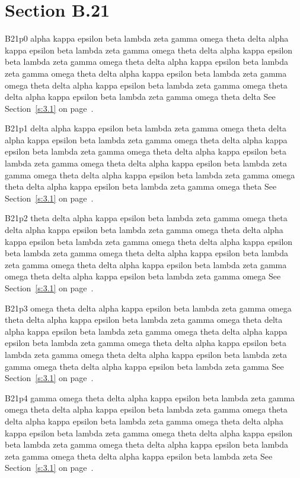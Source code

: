 \section{Section B.21}\label{s:B.21}
B21p0 alpha kappa epsilon beta lambda zeta gamma omega theta delta alpha kappa epsilon beta lambda zeta gamma omega theta delta alpha kappa epsilon beta lambda zeta gamma omega theta delta alpha kappa epsilon beta lambda zeta gamma omega theta delta alpha kappa epsilon beta lambda zeta gamma omega theta delta alpha kappa epsilon beta lambda zeta gamma omega theta delta alpha kappa epsilon beta lambda zeta gamma omega theta delta See Section~\ref{s:3.1} on page~\pageref{s:3.1}.

B21p1 delta alpha kappa epsilon beta lambda zeta gamma omega theta delta alpha kappa epsilon beta lambda zeta gamma omega theta delta alpha kappa epsilon beta lambda zeta gamma omega theta delta alpha kappa epsilon beta lambda zeta gamma omega theta delta alpha kappa epsilon beta lambda zeta gamma omega theta delta alpha kappa epsilon beta lambda zeta gamma omega theta delta alpha kappa epsilon beta lambda zeta gamma omega theta See Section~\ref{s:3.1} on page~\pageref{s:3.1}.

B21p2 theta delta alpha kappa epsilon beta lambda zeta gamma omega theta delta alpha kappa epsilon beta lambda zeta gamma omega theta delta alpha kappa epsilon beta lambda zeta gamma omega theta delta alpha kappa epsilon beta lambda zeta gamma omega theta delta alpha kappa epsilon beta lambda zeta gamma omega theta delta alpha kappa epsilon beta lambda zeta gamma omega theta delta alpha kappa epsilon beta lambda zeta gamma omega See Section~\ref{s:3.1} on page~\pageref{s:3.1}.

B21p3 omega theta delta alpha kappa epsilon beta lambda zeta gamma omega theta delta alpha kappa epsilon beta lambda zeta gamma omega theta delta alpha kappa epsilon beta lambda zeta gamma omega theta delta alpha kappa epsilon beta lambda zeta gamma omega theta delta alpha kappa epsilon beta lambda zeta gamma omega theta delta alpha kappa epsilon beta lambda zeta gamma omega theta delta alpha kappa epsilon beta lambda zeta gamma See Section~\ref{s:3.1} on page~\pageref{s:3.1}.

B21p4 gamma omega theta delta alpha kappa epsilon beta lambda zeta gamma omega theta delta alpha kappa epsilon beta lambda zeta gamma omega theta delta alpha kappa epsilon beta lambda zeta gamma omega theta delta alpha kappa epsilon beta lambda zeta gamma omega theta delta alpha kappa epsilon beta lambda zeta gamma omega theta delta alpha kappa epsilon beta lambda zeta gamma omega theta delta alpha kappa epsilon beta lambda zeta See Section~\ref{s:3.1} on page~\pageref{s:3.1}.

